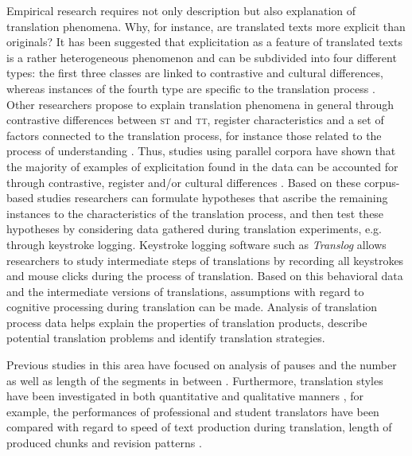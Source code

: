 \documentclass[output=paper]{LSP/langsci}
\begin{document}
Empirical research requires not only description but also explanation of translation phenomena. Why, for instance, are translated texts more explicit than originals? It has been suggested that explicitation as a feature of translated texts is a rather heterogeneous phenomenon and can be subdivided into four different types: the first three classes are linked to contrastive and cultural differences, whereas instances of the fourth type are specific to the translation process \citep[82--83]{Klaudy1998}. Other researchers propose to explain translation phenomena in general through contrastive differences between \textsc{st} and \textsc{tt}, register characteristics and a set of factors connected to the translation process, for instance those related to the process of understanding \citep{Steiner2001}. Thus, studies using parallel corpora have shown that the majority of examples of explicitation found in the data can be accounted for through contrastive, register and/or cultural differences \citep{Hansen-Schirra2007,Becher2010}. Based on these corpus-based studies researchers can formulate hypotheses that ascribe the remaining instances to the characteristics of the translation process, and then test these hypotheses by considering data gathered during translation experiments, e.g. through keystroke logging. Keystroke logging software such as \textit{Translog} \citep{Jakobsen1999} allows researchers to study intermediate steps of translations by recording all keystrokes and mouse clicks during the process of translation. Based on this behavioral data and the intermediate versions of translations, assumptions with regard to cognitive processing during translation can be made. Analysis of translation process data helps explain the properties of translation products, describe potential translation problems and identify translation strategies.

Previous studies in this area have focused on analysis of pauses and the number as well as length of the segments in between \citep[e.g.][]{Dragsted2005,Jakobsen2005,Alves2009,Alves2011}. Furthermore, translation styles have been \enlargethispage{1\baselineskip} investigated in both quantitative and qualitative manners \citep[e.g.][]{Pagano2008, CarlandDragsted2011}, for example, the performances of professional and student translators have been compared with regard to speed of text production during translation, length of produced chunks and revision patterns \citep[e.g.][]{Jakobsen2005}.
 
\end{document}
